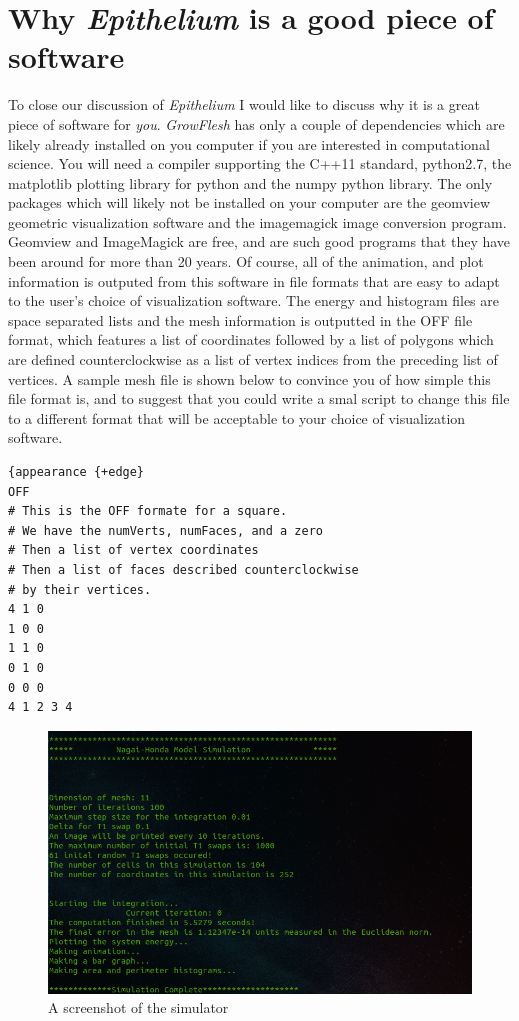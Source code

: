 \section{Why \emph{Epithelium} is a good piece of software}
To close our discussion of \emph{Epithelium} I would like to discuss why it is a great piece of software for \emph{you}. \emph{GrowFlesh} has only a couple of dependencies which are likely already installed on you computer if you are interested in computational science. You will need a compiler supporting the C++11 standard, python2.7,  the matplotlib plotting library for python and the numpy python library. The only packages which will likely not be installed on your computer are the geomview geometric visualization software and the imagemagick image conversion program. Geomview and ImageMagick are free, and are such good programs that they have been around for more than 20 years. Of course, all of the animation, and plot information is outputed from this software in file formats that are easy to adapt to the user's choice of visualization software. The energy and histogram files are space separated lists and the mesh information is outputted in the OFF file format, which features a list of coordinates followed by a list of polygons which are defined counterclockwise as a list of vertex indices from the preceding list of vertices. A  sample mesh file is shown below to convince you of how simple this file format is, and to suggest that you could write a smal script to change this file to a different format that will be acceptable to your choice of visualization software.

\begin{lstlisting}
{appearance {+edge}
OFF 
# This is the OFF formate for a square. 
# We have the numVerts, numFaces, and a zero
# Then a list of vertex coordinates
# Then a list of faces described counterclockwise 
# by their vertices.
4 1 0
1 0 0
1 1 0
0 1 0
0 0 0
4 1 2 3 4
\end{lstlisting}

\begin{figure}[h]
\centering
\includegraphics{../diagrams/screen.png}
\caption{A screenshot of the simulator}
\end{figure}
